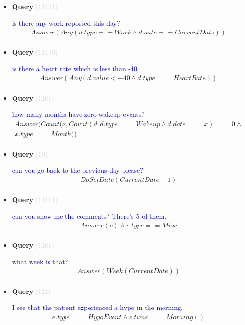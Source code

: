 \documentclass[11pt]{article}
\newcommand{\key}[1]{\textcolor{lightgray}{#1}}
\newcounter{CQuery}
\begin{document}
\begin{itemize}
\item
\textbf{Query\theCQuery} \key{(11101)} \addtocounter{CQuery}{1}
\textcolor{blue}{ is there any work reported this day? }
\begin{multline*}
Answer(Any(d.type==Work \wedge d.date==CurrentDate)) \\ 
\end{multline*}


\item
\textbf{Query\theCQuery} \key{(11100)} \addtocounter{CQuery}{1}
\textcolor{blue}{ is there a heart rate which is less than -40 }
\begin{multline*}
Answer(Any(d.value<-40 \wedge d.type==HeartRate)) \\ 
\end{multline*}


\item
\textbf{Query\theCQuery} \key{(1101)} \addtocounter{CQuery}{1}
\textcolor{blue}{ how many months have zero wakeup events? }
\begin{multline*}
Answer(Count(x, Count(d, d.type==Wakeup \wedge d.date==x)==0 \wedge \\ 
x.type==Month)) \\ 
\end{multline*}


\item
\textbf{Query\theCQuery} \key{(10)} \addtocounter{CQuery}{1}
\textcolor{blue}{ can you go back to the previous day please? }
\begin{multline*}
DoSetDate(CurrentDate - 1) \\ 
\end{multline*}


\item
\textbf{Query\theCQuery} \key{(11111)} \addtocounter{CQuery}{1}
\textcolor{blue}{ can you show me the comments? There's 5 of them. }
\begin{multline*}
Answer(e) \wedge e.type==Misc \\ 
\end{multline*}


\item
\textbf{Query\theCQuery} \key{(1101)} \addtocounter{CQuery}{1}
\textcolor{blue}{ what week is that? }
\begin{multline*}
Answer(Week(CurrentDate)) \\ 
\end{multline*}


\item
\textbf{Query\theCQuery} \key{(121)} \addtocounter{CQuery}{1}
\textcolor{blue}{ I see that the patient experienced a hypo in the morning. }
\begin{multline*}
e.type==HypoEvent \wedge e.time==Morning() \\ 
\end{multline*}



\end{itemize}
\end{document}
